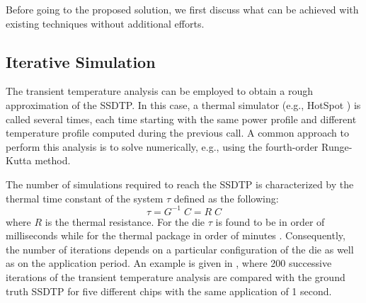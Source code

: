 Before going to the proposed solution, we first discuss what can be achieved with existing techniques without additional efforts.

\subsection{Iterative Simulation}
The transient temperature analysis can be employed to obtain a rough approximation of the SSDTP. In this case, a thermal simulator (e.g., HotSpot \cite{huang2006}) is called several times, each time starting with the same power profile and different temperature profile computed during the previous call. A common approach to perform this analysis is to solve  numerically, e.g., using the fourth-order Runge-Kutta method.

The number of simulations required to reach the SSDTP is characterized by the thermal time constant of the system $\tau$ defined as the following:
\[
  \tau = G^{-1} \; C = R \; C
\]
where $R$ is the thermal resistance. For the die $\tau$ is found to be in order of milliseconds while for the thermal package in order of minutes \cite{rao2007}. Consequently, the number of iterations depends on a particular configuration of the die as well as on the application period. An example is given in , where 200 successive iterations of the transient temperature analysis are compared with the ground truth SSDTP for five different chips with the same application of 1 second.

